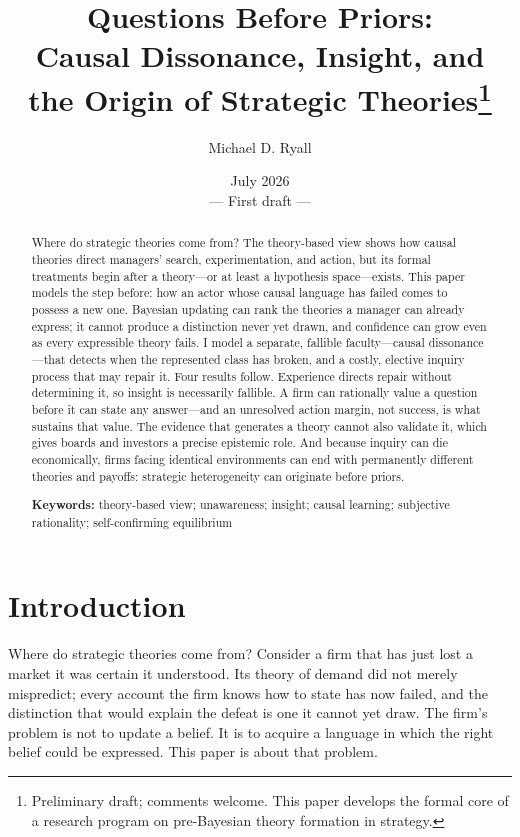 \documentclass[11pt]{article}
\title{\textbf{Questions Before Priors:}\\
Causal Dissonance, Insight, and the Origin of Strategic Theories\thanks{%
Preliminary draft; comments welcome.  This paper develops the formal core of
a research program on pre-Bayesian theory formation in strategy.}}
\author{Michael D. Ryall}
\date{July 2026\\[0.4em]\normalsize --- First draft ---}
\theoremstyle{definition}
\begin{document}
\maketitle

\begin{abstract}
\noindent Where do strategic theories come from?
The theory-based view shows how causal theories direct managers' search, experimentation, and action, but its formal treatments begin after a theory---or at least a hypothesis space---exists.
This paper models the step before: how an actor whose causal language has failed comes to possess a new one.
Bayesian updating can rank the theories a manager can already express; it cannot produce a distinction never yet drawn, and confidence can grow even as every expressible theory fails.
I model a separate, fallible faculty---causal dissonance---that detects when the represented class has broken, and a costly, elective inquiry process that may repair it.
Four results follow.
Experience directs repair without determining it, so insight is necessarily fallible.
A firm can rationally value a question before it can state any answer---and an unresolved action margin, not success, is what sustains that value.
The evidence that generates a theory cannot also validate it, which gives boards and investors a precise epistemic role.
And because inquiry can die economically, firms facing identical environments can end with permanently different theories and payoffs: strategic heterogeneity can originate before priors.
\medskip

\noindent\textbf{Keywords:} theory-based view; unawareness; insight; causal learning; subjective rationality; self-confirming equilibrium
\end{abstract}

\newpage

\section{Introduction}
\label{sec:intro}

Where do strategic theories come from?
Consider a firm that has just lost a market it was certain it understood.
Its theory of demand did not merely mispredict; every account the firm knows how to state has now failed, and the distinction that would explain the defeat is one it cannot yet draw.
The firm's problem is not to update a belief.
It is to acquire a language in which the right belief could be expressed.
This paper is about that problem.
\end{document}
